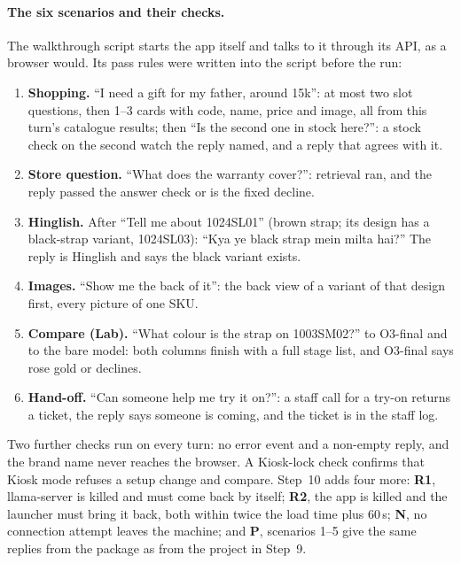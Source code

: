 \documentclass[11pt,a4paper]{article}
\begin{document}
\paragraph{The six scenarios and their checks.} The walkthrough script starts the app itself and talks to it through its
API, as a browser would. Its pass rules were written into the script before the run:
\begin{enumerate}[label=\arabic*.]
  \item \textbf{Shopping.} ``I need a gift for my father, around 15k'': at most two slot questions, then 1--3 cards with
        code, name, price and image, all from this turn's catalogue results; then ``Is the second one in stock here?'':
        a stock check on the second watch the reply named, and a reply that agrees with it.
  \item \textbf{Store question.} ``What does the warranty cover?'': retrieval ran, and the reply passed the answer check
        or is the fixed decline.
  \item \textbf{Hinglish.} After ``Tell me about 1024SL01'' (brown strap; its design has a black-strap variant,
        1024SL03): ``Kya ye black strap mein milta hai?'' The reply is Hinglish and says the black variant exists.
  \item \textbf{Images.} ``Show me the back of it'': the back view of a variant of that design first, every picture of
        one SKU.
  \item \textbf{Compare (Lab).} ``What colour is the strap on 1003SM02?'' to O3-final and to the bare model: both
        columns finish with a full stage list, and O3-final says rose gold or declines.
  \item \textbf{Hand-off.} ``Can someone help me try it on?'': a staff call for a try-on returns a ticket, the reply says
        someone is coming, and the ticket is in the staff log.
\end{enumerate}
Two further checks run on every turn: no error event and a non-empty reply, and the brand name never reaches the browser.
A Kiosk-lock check confirms that Kiosk mode refuses a setup change and compare. Step~10 adds four more:
\textbf{R1}, llama-server is killed and must come back by itself; \textbf{R2}, the app is killed and the launcher must
bring it back, both within twice the load time plus 60\,s; \textbf{N}, no connection attempt leaves the machine; and
\textbf{P}, scenarios 1--5 give the same replies from the package as from the project in Step~9.

\end{document}
